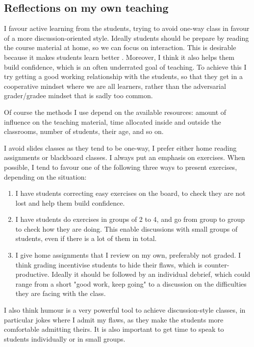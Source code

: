\documentclass{article}
\begin{document}
\subsection{Reflections on my own teaching}

I favour active learning from the students, trying to avoid one-way class in favour of a more discussion-oriented style. Ideally students should be prepare by reading the course material at home, so we can focus on interaction. This is desirable because it makes students learn better \cite{freeman2014active}. Moreover, I think it also helps them build confidence, which is an often underrated goal of teaching. To achieve this I try getting a good working relationship with the students, so that they get in a cooperative mindset where we are all learners, rather than the adversarial grader/gradee mindset that is sadly too common.

Of course the methods I use depend on the available resources: amount of influence on the teaching material, time allocated inside and outside the classrooms, number of students, their age, and so on.

I avoid slides classes as they tend to be one-way, I prefer either home reading assignments or blackboard classes. I always put an emphasis on exercises. When possible, I tend to favour one of the following three ways to present exercises, depending on the situation:
\begin{enumerate}
\item I have students correcting easy exercises on the board, to check they are not lost and help them build confidence.
\item I have students do exercises in groups of 2 to 4, and go from group to group to check how they are doing. This enable discussions with small groups of students, even if there is a lot of them in total.
\item I give home assignments that I review on my own, preferably not graded. I think grading incentivise students to hide their flaws, which is counter-productive. Ideally it should be followed by an individual debrief, which could range from a short "good work, keep going" to a discussion on the difficulties they are facing with the class.
\end{enumerate}

I also think humour is a very powerful tool to achieve discussion-style classes, in particular jokes where I admit my flaws, as they make the students more comfortable admitting theirs. It is also important to get time to speak to students individually or in small groups.
\end{document}
